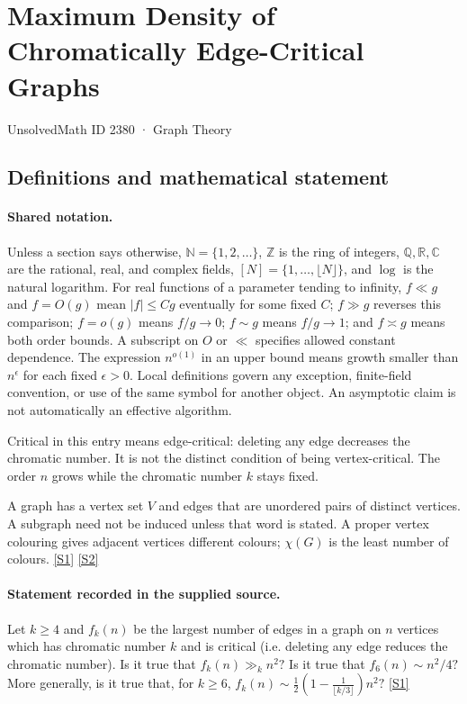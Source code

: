 \documentclass[11pt,a4paper]{article}
\newcommand{\N}{\mathbb{N}}
\newcommand{\Z}{\mathbb{Z}}
\newcommand{\Q}{\mathbb{Q}}
\newcommand{\R}{\mathbb{R}}
\newcommand{\C}{\mathbb{C}}
\newcommand{\sref}[2]{\hyperlink{source:#1:#2}{[S#2]}}
\begin{document}

\setcounter{section}{2379}

\section{Maximum Density of Chromatically Edge-Critical Graphs}\label{2380}

{\small\sffamily UnsolvedMath ID 2380 · Graph Theory}

\subsection{Definitions and mathematical statement}

\paragraph{Shared notation.}Unless a section says otherwise, $\N=\{1,2,\ldots\}$,
$\Z$ is the ring of integers, $\Q,\R,\C$ are the rational, real, and complex
fields, $[N]=\{1,\ldots,\lfloor N\rfloor\}$, and $\log$ is the natural
logarithm. For real functions of a parameter tending to infinity,
$f\ll g$ and $f=O(g)$ mean $|f|\leq Cg$ eventually for some fixed $C$;
$f\gg g$ reverses this comparison; $f=o(g)$ means $f/g\to0$;
$f\sim g$ means $f/g\to1$; and $f\asymp g$ means both order bounds.
A subscript on $O$ or $\ll$ specifies allowed constant dependence.
The expression $n^{o(1)}$ in an upper bound means growth smaller than
$n^\epsilon$ for each fixed $\epsilon>0$. Local definitions govern any
exception, finite-field convention, or use of the same symbol for another
object. An asymptotic claim is not automatically an effective algorithm.



Critical in this entry means edge-critical: deleting any edge decreases the chromatic number. It is not the distinct condition of being vertex-critical. The order $n$ grows while the chromatic number $k$ stays fixed.

A graph has a vertex set $V$ and edges that are unordered pairs of distinct vertices. A subgraph need not be induced unless that word is stated. A proper vertex colouring gives adjacent vertices different colours; $\chi(G)$ is the least number of colours. \sref{2380}{1} \sref{2380}{2}

\paragraph{Statement recorded in the supplied source.}
Let $k\geq 4$ and $f_k(n)$ be the largest number of edges in a graph on $n$ vertices which has chromatic number $k$ and is critical (i.e. deleting any edge reduces the chromatic number).
Is it true that $ f_k(n) \gg_k n^2? $ Is it true that $ f_6(n)\sim n^2/4? $ More generally, is it true that, for $k\geq 6$, $ f_k(n) \sim \frac{1}{2}\left(1-\frac{1}{\lfloor k/3\rfloor}\right)n^2? $ \sref{2380}{1}
\end{document}
